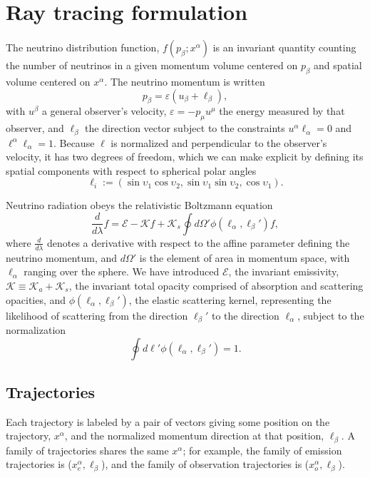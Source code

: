 \documentclass[aps,prd,twocolumn,superscriptaddress,groupedaddress]{revtex4}
\newcommand{\todo}[1]{\marginpar{\tiny{\textcolor{red}{#1}}}}
\begin{document}
\section{Ray tracing formulation}

The neutrino distribution function, $f(p_\beta; x^\alpha)$ is an invariant
quantity counting the number of neutrinos in a given momentum volume centered on
$p_\beta$ and spatial volume centered on $x^\alpha$.
The neutrino momentum is written
\begin{equation}
  \label{eqn:def_momentum}
  p_\beta = \varepsilon (u_\beta + \ell_\beta),
\end{equation}
with $u^\beta$ a general observer's velocity,
$\varepsilon=-p_\mu u^\mu$ the energy measured by that observer,
and $\ell_\beta$ the direction vector subject to the constraints
$u^\alpha \ell_\alpha = 0$ and
$\ell^\alpha \ell_\alpha=1$.
Because $\ell$ is normalized and perpendicular to the observer's velocity,
it has two degrees of freedom, which we can make explicit by defining its
spatial components with respect to spherical polar angles
\begin{equation}
  \label{eq:def_direction}
  \ell_i :=
  (\sin\upsilon_1\cos\upsilon_2,\sin\upsilon_1\sin\upsilon_2,\cos\upsilon_1).
\end{equation}

Neutrino radiation obeys the relativistic Boltzmann equation
\begin{equation}
  \label{eqn:boltzmann}
  \frac{d}{d\lambda}f = \mathscr{E} - \mathscr{K} f
  + \mathscr{K}_s \oint d\Omega' \phi(\ell_\alpha,\ell_\beta') f,
\end{equation}
where $\frac{d}{d\lambda}$ denotes a derivative with respect to the affine
parameter defining the neutrino momentum,
and $d\Omega'$ is the element of area in momentum space, with $\ell_\alpha$
ranging over the sphere.
We have introduced
$\mathscr{E}$, the invariant emissivity,
$\mathscr{K}\equiv\mathscr{K}_a+\mathscr{K}_s$, the invariant total opacity
comprised of absorption and scattering opacities, and
$\phi(\ell_\alpha,\ell_\beta')$, the elastic scattering kernel, representing the
likelihood of scattering from the direction $\ell_\beta'$ to the direction
$\ell_\alpha$, subject to the normalization
\todo{confirm this}
\begin{equation}
  \oint d\ell' \phi(\ell_\alpha,\ell_\beta') = 1.
  \nonumber
\end{equation}

\subsection{Trajectories}
\label{ssc:trajectories}
Each trajectory is labeled by a pair of vectors
giving some position on the trajectory, $x^\alpha$,
and the normalized momentum direction at that position,
$\ell_\beta$.
A family of trajectories shares the same $x^\alpha$; for example,
the family of emission trajectories is ($x^\alpha_e,\ell_\beta$),
and the family of observation trajectories is ($x^\alpha_o,\ell_\beta$).
\end{document}
